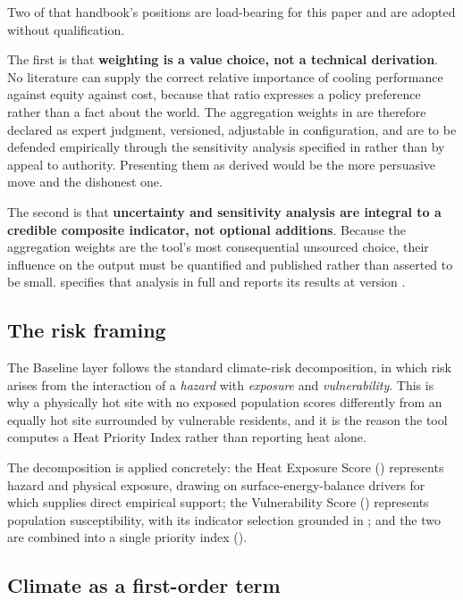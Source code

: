 Two of that handbook's positions are load-bearing for this paper and are
adopted without qualification.

The first is that \textbf{weighting is a value choice, not a technical
derivation}. No literature can supply the correct relative importance of
cooling performance against equity against cost, because that ratio expresses a
policy preference rather than a fact about the world. The aggregation weights
in  are therefore declared as expert judgment, versioned,
adjustable in configuration, and are to be defended empirically through the
sensitivity analysis specified in  rather than by appeal
to authority. Presenting them as derived would be the more persuasive move and
the dishonest one.

The second is that \textbf{uncertainty and sensitivity analysis are integral to
a credible composite indicator, not optional additions}. Because the
aggregation weights are the tool's most consequential unsourced choice, their
influence on the output must be quantified and published rather than asserted
to be small.  specifies that analysis in full and
 reports its results at version \methver{}.

\subsection{The risk framing}

The Baseline layer follows the standard climate-risk decomposition, in which
risk arises from the interaction of a \emph{hazard} with \emph{exposure} and
\emph{vulnerability}. This is why a physically hot site with no exposed
population scores differently from an equally hot site surrounded by vulnerable
residents, and it is the reason the tool computes a Heat Priority Index rather
than reporting heat alone.

The decomposition is applied concretely: the Heat Exposure Score
() represents hazard and physical exposure, drawing on
surface-energy-balance drivers for which \textcite{ziter2019} supplies direct
empirical support; the Vulnerability Score () represents
population susceptibility, with its indicator selection grounded in
\textcite{reid2009}; and the two are combined into a single priority index
().

\subsection{Climate as a first-order term}
\label{sec:climate-first}

